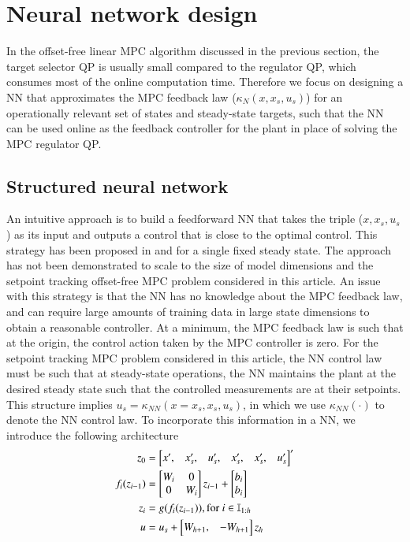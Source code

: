 \documentclass[preprint,5p, twocolumn, authoryear]{elsarticle}
\begin{document}
\section{Neural network design} \label{sec:controller_design}

In the offset-free linear MPC algorithm discussed in the previous section, the
target selector QP is usually small compared to the regulator QP, which consumes
most of the online computation time. Therefore we focus on designing a NN that
approximates the MPC feedback law ($\kappa_N(x, x_s, u_s)$) for an operationally
relevant set of states and steady-state targets, such that the NN can be used
online as the feedback controller for the plant in place of solving the MPC
regulator QP.

\subsection{Structured neural network}
An intuitive approach is to build a feedforward NN that takes the triple ($x,
x_s, u_s$) as its input and outputs a control that is close to the optimal
control. This strategy has been proposed in \cite*{karg:lucia:2020} and 
\cite*{chen:saulnier:atanasov:lee:kumar:pappas:morari:2018}
for a single fixed steady state. The approach has not been demonstrated to scale
to the size of model dimensions and the setpoint tracking offset-free MPC
problem considered in this article. An issue with this strategy is that the NN
has no knowledge about the MPC feedback law, and can require large amounts of
training data in large state dimensions to obtain a reasonable controller. At a
minimum, the MPC feedback law is such that at the origin, the control action
taken by the MPC controller is zero. For the setpoint tracking MPC problem
considered in this article, the NN control law must be such that at steady-state
operations, the NN maintains the plant at the desired steady state such that the
controlled measurements are at their setpoints. This structure implies $u_s =
\kappa_{NN}(x = x_s, x_s, u_s)$, in which we use $\kappa_{NN}(\cdot)$ to denote
the NN control law. To incorporate this information in a NN, we introduce the
following architecture
\begin{align}
z_0 &= \begin{bmatrix}
    x', & x_s', & u_s', & x_s', & x_s', & u_s' \end{bmatrix}'\notag \\
    f_i(z_{i-1}) &= \begin{bmatrix}
        W_i & 0 \notag \\
        0 & W_i
          \end{bmatrix}z_{i-1}  + \begin{bmatrix}
            b_i \\
            b_i
            \end{bmatrix} \notag\\
    z_i &= g(f_i(z_{i-1})), \textnormal{for} \ i \in \mathbb{I}_{1:h} \notag \\
    u &= u_s + \begin{bmatrix}
  W_{h + 1}, & -W_{h + 1} \\
    \end{bmatrix} z_h
\label{eq:NNstruct}
\end{align}
\end{document}
